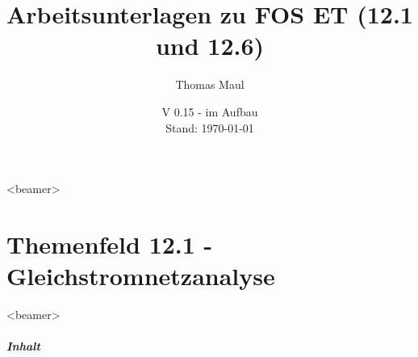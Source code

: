 \documentclass[aspectratio=169, ignorenonframetext]{beamer}
\title{Arbeitsunterlagen zu FOS ET (12.1 und 12.6)}
\date{V 0.15 - im Aufbau\\ Stand: \today}%
\institute[BWS Hofheim]{Brühlwiesenschule, Hofheim}
\author{Thomas Maul}
\begin{document}
\begin{frame}<beamer>
  \titlepage
\end{frame}


\part{Themenfeld 12.1 - Gleichstromnetzanalyse}
\begin{frame}
  \partpage
\end{frame}
\begin{frame}<beamer>
      \frametitle{Inhalt}
  \begin{columns}
    \tableofcontents[sections={1-3},hidesubsections]%
    \tableofcontents[sections={4-},hidesubsections]%
  \end{columns}
\end{frame}
\end{document}
